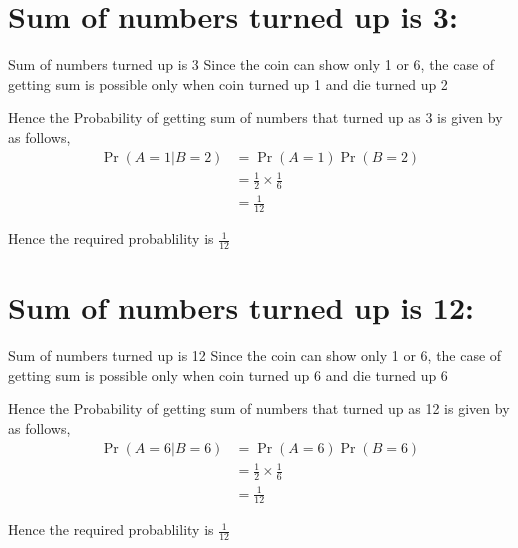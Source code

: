 \documentclass{beamer}
\providecommand{\pr}[1]{\ensuremath{\Pr\left(#1\right)}}
\begin{document}
\section{Sum of numbers turned up is 3:}
\begin{frame}{Sum of numbers turned up is 3}
Since the coin can show only 1 or 6, the case of getting sum is possible only when coin turned up 1 and die turned up 2 \newline

Hence the Probability of getting sum of numbers that turned up as 3 is given by as follows,
\begin{align*}
	\pr{A = 1 | B = 2} &= \pr{A = 1} \pr{B = 2} \\
	&= \frac{1}{2} \times \frac{1}{6} \\
	&= \frac{1}{12}
\end{align*}
\begin{block}{}
Hence the required probablility is $\frac{1}{12}$
\end{block}
\end{frame}

\section{Sum of numbers turned up is 12:}
\begin{frame}{Sum of numbers turned up is 12}
Since the coin can show only 1 or 6, the case of getting sum is possible only when coin turned up 6 and die turned up 6 \newline

Hence the Probability of getting sum of numbers that turned up as 12 is given by as follows,
\begin{align*}
	\pr{A = 6 | B = 6} &= \pr{A = 6} \pr{B = 6} \\
	&= \frac{1}{2} \times \frac{1}{6} \\
	&= \frac{1}{12}
\end{align*}
\begin{block}{}
Hence the required probablility is $\frac{1}{12}$
\end{block}
\end{frame}

\end{document}
